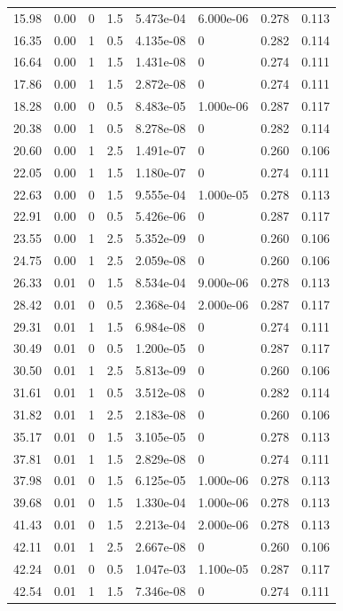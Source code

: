 \documentclass[preview]{standalone}
\begin{document}
{{\begin{tabular}{L{1.2cm}C{1.2cm} C{0.3cm}C{0.5cm} C{1.4cm}C{1.4cm} C{1.4cm}C{1.4cm}}
  15.98  &  0.00  & 0     & 1.5 &  5.473e-04  & 6.000e-06  & 0.278 &  0.113   \\ 
  16.35  &  0.00  & 1     & 0.5 &  4.135e-08  & 0  & 0.282 &  0.114   \\ 
  16.64  &  0.00  & 1     & 1.5 &  1.431e-08  & 0  & 0.274 &  0.111   \\ 
  17.86  &  0.00  & 1     & 1.5 &  2.872e-08  & 0  & 0.274 &  0.111   \\ 
  18.28  &  0.00  & 0     & 0.5 &  8.483e-05  & 1.000e-06  & 0.287 &  0.117   \\ 
  20.38  &  0.00  & 1     & 0.5 &  8.278e-08  & 0  & 0.282 &  0.114   \\ 
  20.60  &  0.00  & 1     & 2.5 &  1.491e-07  & 0  & 0.260 &  0.106   \\ 
  22.05  &  0.00  & 1     & 1.5 &  1.180e-07  & 0  & 0.274 &  0.111   \\ 
  22.63  &  0.00  & 0     & 1.5 &  9.555e-04  & 1.000e-05  & 0.278 &  0.113   \\ 
  22.91  &  0.00  & 0     & 0.5 &  5.426e-06  & 0  & 0.287 &  0.117   \\ 
  23.55  &  0.00  & 1     & 2.5 &  5.352e-09  & 0  & 0.260 &  0.106   \\ 
  24.75  &  0.00  & 1     & 2.5 &  2.059e-08  & 0  & 0.260 &  0.106   \\ 
  26.33  &  0.01  & 0     & 1.5 &  8.534e-04  & 9.000e-06  & 0.278 &  0.113   \\ 
  28.42  &  0.01  & 0     & 0.5 &  2.368e-04  & 2.000e-06  & 0.287 &  0.117   \\ 
  29.31  &  0.01  & 1     & 1.5 &  6.984e-08  & 0  & 0.274 &  0.111   \\ 
  30.49  &  0.01  & 0     & 0.5 &  1.200e-05  & 0  & 0.287 &  0.117   \\ 
  30.50  &  0.01  & 1     & 2.5 &  5.813e-09  & 0  & 0.260 &  0.106   \\ 
  31.61  &  0.01  & 1     & 0.5 &  3.512e-08  & 0  & 0.282 &  0.114   \\ 
  31.82  &  0.01  & 1     & 2.5 &  2.183e-08  & 0  & 0.260 &  0.106   \\ 
  35.17  &  0.01  & 0     & 1.5 &  3.105e-05  & 0  & 0.278 &  0.113   \\ 
  37.81  &  0.01  & 1     & 1.5 &  2.829e-08  & 0  & 0.274 &  0.111   \\ 
  37.98  &  0.01  & 0     & 1.5 &  6.125e-05  & 1.000e-06  & 0.278 &  0.113   \\ 
  39.68  &  0.01  & 0     & 1.5 &  1.330e-04  & 1.000e-06  & 0.278 &  0.113   \\ 
  41.43  &  0.01  & 0     & 1.5 &  2.213e-04  & 2.000e-06  & 0.278 &  0.113   \\ 
  42.11  &  0.01  & 1     & 2.5 &  2.667e-08  & 0  & 0.260 &  0.106   \\ 
  42.24  &  0.01  & 0     & 0.5 &  1.047e-03  & 1.100e-05  & 0.287 &  0.117   \\ 
  42.54  &  0.01  & 1     & 1.5 &  7.346e-08  & 0  & 0.274 &  0.111   \\ 
\hline 
\end{tabular} 

}}
\end{document}
